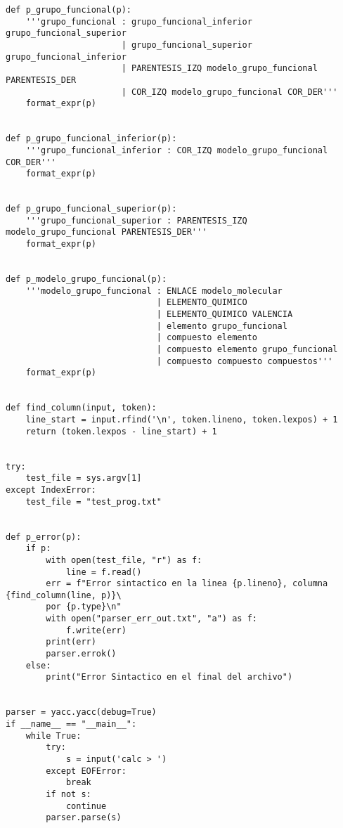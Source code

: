 \begin{verbatim}
def p_grupo_funcional(p):
    '''grupo_funcional : grupo_funcional_inferior grupo_funcional_superior
                       | grupo_funcional_superior grupo_funcional_inferior
                       | PARENTESIS_IZQ modelo_grupo_funcional PARENTESIS_DER
                       | COR_IZQ modelo_grupo_funcional COR_DER'''
    format_expr(p)


def p_grupo_funcional_inferior(p):
    '''grupo_funcional_inferior : COR_IZQ modelo_grupo_funcional COR_DER'''
    format_expr(p)


def p_grupo_funcional_superior(p):
    '''grupo_funcional_superior : PARENTESIS_IZQ modelo_grupo_funcional PARENTESIS_DER'''
    format_expr(p)


def p_modelo_grupo_funcional(p):
    '''modelo_grupo_funcional : ENLACE modelo_molecular
                              | ELEMENTO_QUIMICO
                              | ELEMENTO_QUIMICO VALENCIA
                              | elemento grupo_funcional
                              | compuesto elemento
                              | compuesto elemento grupo_funcional
                              | compuesto compuesto compuestos'''
    format_expr(p)


def find_column(input, token):
    line_start = input.rfind('\n', token.lineno, token.lexpos) + 1
    return (token.lexpos - line_start) + 1


try:
    test_file = sys.argv[1]
except IndexError:
    test_file = "test_prog.txt"


def p_error(p):
    if p:
        with open(test_file, "r") as f:
            line = f.read()
        err = f"Error sintactico en la linea {p.lineno}, columna {find_column(line, p)}\
        por {p.type}\n"
        with open("parser_err_out.txt", "a") as f:
            f.write(err)
        print(err)
        parser.errok()
    else:
        print("Error Sintactico en el final del archivo")


parser = yacc.yacc(debug=True)
if __name__ == "__main__":
    while True:
        try:
            s = input('calc > ')
        except EOFError:
            break
        if not s:
            continue
        parser.parse(s)

\end{verbatim}

\label{apendixB}

